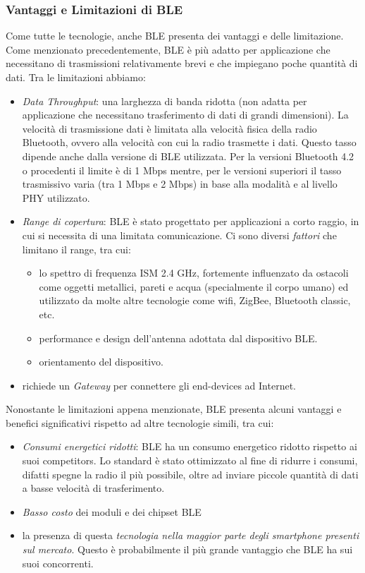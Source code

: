 \subsubsection{Vantaggi e Limitazioni di BLE}
Come tutte le tecnologie, anche BLE presenta dei vantaggi e delle limitazione. Come menzionato precedentemente, BLE è più adatto per applicazione che necessitano di trasmissioni relativamente brevi e che impiegano poche quantità di dati. Tra le limitazioni abbiamo:
\begin{itemize}
    \item \textit{Data Throughput}: una larghezza di banda ridotta (non adatta per applicazione che necessitano trasferimento di dati di grandi dimensioni). La velocità di trasmissione dati è limitata alla velocità fisica della radio Bluetooth, ovvero alla velocità con cui la radio trasmette i dati. Questo tasso dipende anche dalla versione di BLE utilizzata. Per la versioni Bluetooth 4.2 o procedenti il limite è di 1 Mbps mentre, per le versioni superiori il tasso trasmissivo varia (tra 1 Mbps e 2 Mbps) in base alla modalità e al livello PHY utilizzato.
    
    \item \textit{Range di copertura}: BLE è stato progettato per applicazioni a corto raggio, in cui si necessita di una limitata comunicazione. Ci sono diversi \textit{fattori} che limitano il range, tra cui: 
    \begin{itemize}
        \item lo spettro di frequenza ISM 2.4 GHz, fortemente influenzato da ostacoli come oggetti metallici, pareti e acqua (specialmente il corpo umano) ed utilizzato da molte altre tecnologie come wifi, ZigBee, Bluetooth classic, etc.
        \item performance e design dell'antenna adottata dal dispositivo BLE.
        \item orientamento del dispositivo.
    \end{itemize}
    
    \item richiede un \textit{Gateway} per connettere gli end-devices ad Internet.
\end{itemize}

\noindent Nonostante le limitazioni appena menzionate, BLE presenta alcuni vantaggi e benefici significativi rispetto ad altre tecnologie simili, tra cui:
\begin{itemize}
    \item \textit{Consumi energetici ridotti}: BLE ha un consumo energetico ridotto rispetto ai suoi competitors. Lo standard è stato ottimizzato al fine di ridurre i consumi, difatti spegne la radio il più possibile, oltre ad inviare piccole quantità di dati a basse velocità di trasferimento.
    \item \textit{Basso costo} dei moduli e dei chipset BLE
    \item la presenza di questa \textit{tecnologia nella maggior parte degli smartphone presenti sul mercato}. Questo è probabilmente il più grande vantaggio che BLE ha sui suoi concorrenti.
\end{itemize}

